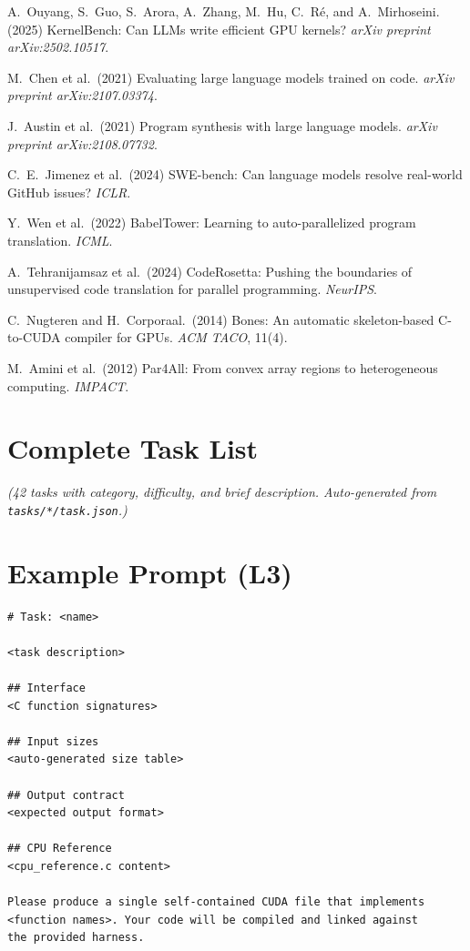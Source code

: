 \documentclass{article}
\begin{document}
\medskip
{\small

A.\ Ouyang, S.\ Guo, S.\ Arora, A.\ Zhang, M.\ Hu, C.\ R\'e, and A.\ Mirhoseini.
(2025) KernelBench: Can LLMs write efficient GPU kernels?
{\it arXiv preprint arXiv:2502.10517}.

M.\ Chen et al.\ (2021) Evaluating large language models trained on code.
{\it arXiv preprint arXiv:2107.03374}.

J.\ Austin et al.\ (2021) Program synthesis with large language models.
{\it arXiv preprint arXiv:2108.07732}.

C.\ E.\ Jimenez et al.\ (2024) SWE-bench: Can language models resolve
real-world GitHub issues?
{\it ICLR}.

Y.\ Wen et al.\ (2022) BabelTower: Learning to auto-parallelized program
translation.
{\it ICML}.

A.\ Tehranijamsaz et al.\ (2024) CodeRosetta: Pushing the boundaries of
unsupervised code translation for parallel programming.
{\it NeurIPS}.

C.\ Nugteren and H.\ Corporaal.\ (2014) Bones: An automatic skeleton-based
C-to-CUDA compiler for GPUs.
{\it ACM TACO}, 11(4).

M.\ Amini et al.\ (2012) Par4All: From convex array regions to heterogeneous
computing.
{\it IMPACT}.
}


\appendix

\section{Complete Task List}
\label{app:tasklist}

\emph{(42 tasks with category, difficulty, and brief description.
Auto-generated from \texttt{tasks/*/task.json}.)}

\section{Example Prompt (L3)}
\label{app:prompt}

\begin{lstlisting}[style=cuda,caption={Canonical L3 prompt structure.}]
# Task: <name>

<task description>

## Interface
<C function signatures>

## Input sizes
<auto-generated size table>

## Output contract
<expected output format>

## CPU Reference
<cpu_reference.c content>

Please produce a single self-contained CUDA file that implements
<function names>. Your code will be compiled and linked against
the provided harness.
\end{lstlisting}


\newpage

\end{document}
